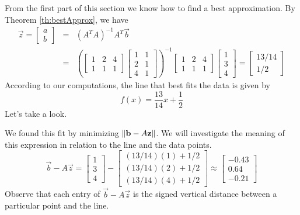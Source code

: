\documentclass{ximera}
\begin{document}
\begin{exploration}
    From the first part of this section we know how to find a best approximation.  By Theorem \ref{th:bestApprox}, we have
    \begin{eqnarray*}
\vec{z}=\begin{bmatrix}a\\b\end{bmatrix}&=&\left(A^TA\right)^{-1}A^T\vec{b}\\
&=&\left(\begin{bmatrix}1&2&4\\1&1&1\end{bmatrix}\begin{bmatrix}
1&1\\2&1\\4&1\end{bmatrix}\right)^{-1}\begin{bmatrix}1&2&4\\1&1&1\end{bmatrix}\begin{bmatrix}
    1\\3\\4
\end{bmatrix}=\begin{bmatrix}13/14\\1/2\end{bmatrix}
\end{eqnarray*}
According to our computations, the line that best fits the data is given by $$f(x)=\frac{13}{14}x+\frac{1}{2}$$
Let's take a look.
\begin{center}
 \end{center}

We found this fit by minimizing $\left\lVert\mathbf{b}-A\mathbf{z}\right\rVert$.  We will investigate the meaning of this expression in relation to the line and the data points.
\begin{equation}
    \vec{b}-A\vec{z}=\begin{bmatrix}1\\3\\4\end{bmatrix}-\begin{bmatrix}(13/14)(1)+1/2\\(13/14)(2)+1/2\\{(13/14)(4)+1/2}\end{bmatrix}\approx\begin{bmatrix}
        -0.43\\0.64\\-0.21
    \end{bmatrix}
\end{equation}
Observe that each entry of $\vec{b}-A\vec{z}$ is the signed vertical distance between a particular point and the line.


\end{exploration}
\end{document}
